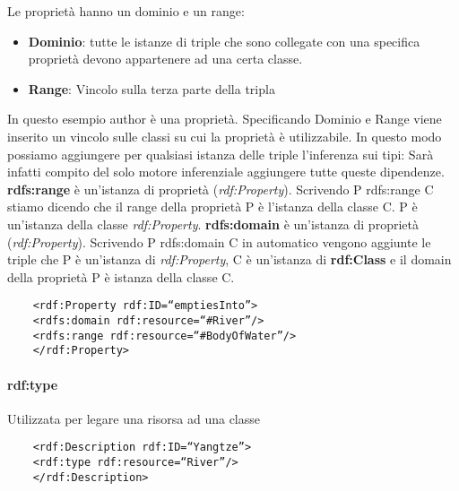 Le proprietà hanno un dominio e un range:
\begin{itemize}
	\item \textbf{Dominio}: tutte le istanze di triple che sono collegate con una specifica proprietà devono appartenere ad una certa classe.
	\item \textbf{Range}: Vincolo sulla terza parte della tripla
\end{itemize}
In questo esempio author è una proprietà. Specificando Dominio e Range viene inserito un vincolo sulle classi su cui la proprietà è utilizzabile.
In questo modo possiamo aggiungere per qualsiasi istanza delle triple l'inferenza sui tipi:
Sarà infatti compito del solo motore inferenziale aggiungere tutte queste dipendenze.\newline\newline
\textbf{rdfs:range} è  un'istanza di proprietà (\textit{rdf:Property}). Scrivendo \textcolor{ao(english)}{P rdfs:range C} stiamo dicendo che il range della proprietà P è l'istanza della classe C. P è un'istanza della classe \textit{rdf:Property}.\newline\newline
\textbf{rdfs:domain} è  un'istanza di proprietà (\textit{rdf:Property}). Scrivendo \textcolor{ao(english)}{P rdfs:domain C} in automatico vengono aggiunte  le triple che P è un'istanza di \textit{rdf:Property}, C è un'istanza di \textbf{rdf:Class} e il domain della proprietà P è istanza della classe C.
\begin{verbatim}
	<rdf:Property rdf:ID=“emptiesInto”>
	<rdfs:domain rdf:resource=“#River”/>
	<rdfs:range rdf:resource=“#BodyOfWater”/>
	</rdf:Property>
\end{verbatim}

\paragraph{rdf:type}
Utilizzata per legare una risorsa ad una classe
\begin{verbatim}
	<rdf:Description rdf:ID=“Yangtze”>
	<rdf:type rdf:resource=“River”/>
	</rdf:Description>
\end{verbatim}

